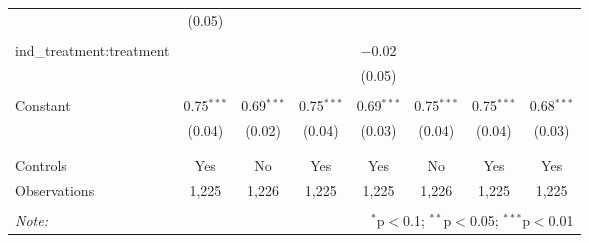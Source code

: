 \begin{table}[!htbp]
\begin{tabular}{@{\extracolsep{5pt}}lccccccc}
  & (0.05) &  &  &  &  &  &  \\ 
  & & & & & & & \\ 
 ind\_treatment:treatment &  &  &  & $-$0.02 &  &  &  \\ 
  &  &  &  & (0.05) &  &  &  \\ 
  & & & & & & & \\ 
 Constant & 0.75$^{***}$ & 0.69$^{***}$ & 0.75$^{***}$ & 0.69$^{***}$ & 0.75$^{***}$ & 0.75$^{***}$ & 0.68$^{***}$ \\ 
  & (0.04) & (0.02) & (0.04) & (0.03) & (0.04) & (0.04) & (0.03) \\ 
  & & & & & & & \\ 
\hline \\[-1.8ex] 
Controls & Yes & No & Yes & Yes & No & Yes & Yes \\ 
Observations & 1,225 & 1,226 & 1,225 & 1,225 & 1,226 & 1,225 & 1,225 \\ 
\hline 
\hline \\[-1.8ex] 
\textit{Note:}  & \multicolumn{7}{r}{$^{*}$p$<$0.1; $^{**}$p$<$0.05; $^{***}$p$<$0.01} \\ 
\end{tabular} 
\end{table} 
